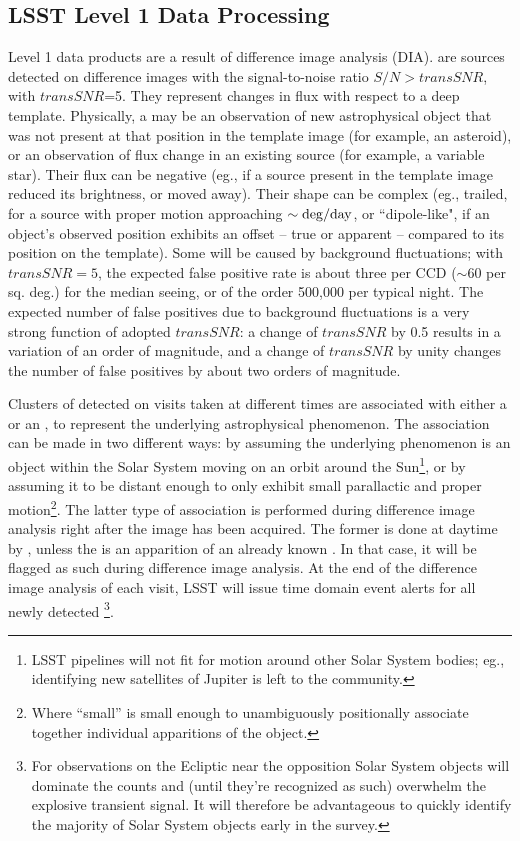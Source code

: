 \subsection{LSST Level 1 Data Processing}

Level 1 data products are a result of difference image analysis (DIA).
\DIASources are sources detected on difference images with the signal-to-noise ratio $S/N>transSNR$,
with $transSNR$=5.
They represent changes in flux with respect to a deep template. Physically, a \DIASource may be an observation of new astrophysical object that was not present at that position in the template image (for example, an asteroid), or an observation of flux change in an existing source (for example, a variable star). Their flux can be negative (eg., if a source present in the template image reduced its brightness, or moved away). Their shape can be complex (eg., trailed, for a source with proper motion approaching $\sim {\rm deg}/{\rm day}$, or ``dipole-like", if an object's observed position exhibits an offset -- true or apparent -- compared to its position on the template).
Some \DIASources will be caused by background fluctuations; with $transSNR = 5$,
the expected false positive rate is about three per CCD ($\sim 60$ per sq. deg.) for the median seeing,
or of the order 500,000 per typical night.
The expected number of false positives due to background fluctuations is a very strong function
of adopted $transSNR$: a change of $transSNR$ by 0.5
results in a variation of an order of magnitude, and a change of $transSNR$ by unity changes the number of false
positives by about two orders of magnitude.

Clusters of \DIASources detected on visits taken at different times are associated with either a \DIAObject or an \SSObject, to represent the underlying astrophysical phenomenon. The association can be made in two different ways: by assuming the underlying phenomenon is an object within the Solar System moving on an orbit around the Sun\footnote{LSST pipelines will not fit for motion around other Solar System bodies; eg., identifying new satellites of Jupiter is left to the community.}, or by assuming it to be distant enough to only exhibit small parallactic and proper motion\footnote{Where ``small'' is small enough to unambiguously positionally associate together individual apparitions of the object.}. The latter type of association is performed during difference image analysis right after the image has been acquired. The former is done at daytime by , unless the \DIASource is an apparition of an already known \SSObject. In that case, it will be flagged as such during difference image analysis. At the end of the difference image analysis of each visit, LSST will issue time domain event alerts for all
newly detected \DIASources\footnote{For observations on the Ecliptic near the opposition Solar System objects will dominate the \DIASource counts and (until they're recognized as such) overwhelm the explosive transient signal. It will therefore be advantageous to quickly identify the majority of Solar System objects early in the survey.}.

